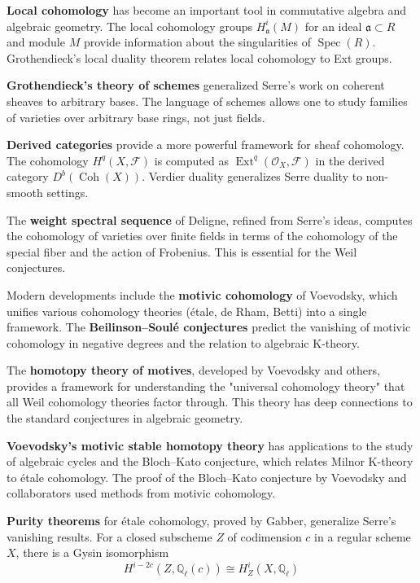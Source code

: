 \textbf{Local cohomology} has become an important tool in commutative algebra and algebraic geometry. The local cohomology groups $H^i_{\mathfrak{a}}(M)$ for an ideal $\mathfrak{a} \subset R$ and module $M$ provide information about the singularities of $\operatorname{Spec}(R)$. Grothendieck's local duality theorem relates local cohomology to Ext groups.

\textbf{Grothendieck's theory of schemes} generalized Serre's work on coherent sheaves to arbitrary bases. The language of schemes allows one to study families of varieties over arbitrary base rings, not just fields.

\textbf{Derived categories} provide a more powerful framework for sheaf cohomology. The cohomology $H^q(X, \mathcal{F})$ is computed as $\operatorname{Ext}^q(\mathcal{O}_X, \mathcal{F})$ in the derived category $D^b(\operatorname{Coh}(X))$. Verdier duality generalizes Serre duality to non-smooth settings.

The \textbf{weight spectral sequence} of Deligne, refined from Serre's ideas, computes the cohomology of varieties over finite fields in terms of the cohomology of the special fiber and the action of Frobenius. This is essential for the Weil conjectures.

Modern developments include the \textbf{motivic cohomology} of Voevodsky, which unifies various cohomology theories (étale, de Rham, Betti) into a single framework. The \textbf{Beilinson--Soulé conjectures} predict the vanishing of motivic cohomology in negative degrees and the relation to algebraic K-theory.

The \textbf{homotopy theory of motives}, developed by Voevodsky and others, provides a framework for understanding the "universal cohomology theory" that all Weil cohomology theories factor through. This theory has deep connections to the standard conjectures in algebraic geometry.

\textbf{Voevodsky's motivic stable homotopy theory} has applications to the study of algebraic cycles and the Bloch--Kato conjecture, which relates Milnor K-theory to étale cohomology. The proof of the Bloch--Kato conjecture by Voevodsky and collaborators used methods from motivic cohomology.

\textbf{Purity theorems} for étale cohomology, proved by Gabber, generalize Serre's vanishing results. For a closed subscheme $Z$ of codimension $c$ in a regular scheme $X$, there is a Gysin isomorphism
\[H^{i-2c}(Z, \mathbb{Q}_\ell(c)) \cong H^i_Z(X, \mathbb{Q}_\ell)\]

